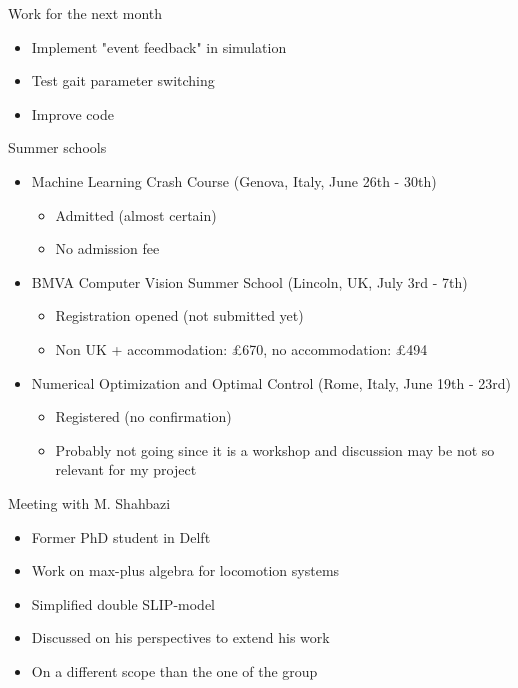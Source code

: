 \documentclass{beamer}
\begin{document}
\begin{frame}{Work for the next month}
\begin{itemize}\setlength\itemsep{3em}
\item Implement "event feedback" in simulation
\item Test gait parameter switching
\item Improve code
\end{itemize}
\end{frame}

\begin{frame}{Summer schools}
\begin{itemize}
\item Machine Learning Crash Course (Genova, Italy, June 26th - 30th)
\begin{itemize}
\item Admitted (almost certain)
\item No admission fee
\end{itemize}
\item BMVA Computer Vision Summer School (Lincoln, UK, July 3rd - 7th)
\begin{itemize}
\item Registration opened (not submitted yet)
\item Non UK + accommodation: £670, no accommodation: £494
\end{itemize}
\item Numerical Optimization and Optimal Control (Rome, Italy, June 19th - 23rd)
\begin{itemize}
\item Registered (no confirmation)
\item Probably not going since it is a workshop and discussion may be not so relevant for my project
\end{itemize}
\end{itemize}
\end{frame}

\begin{frame}{Meeting with M. Shahbazi}
\begin{itemize}\setlength\itemsep{2em}
\item Former PhD student in Delft
\item Work on max-plus algebra for locomotion systems
\item Simplified double SLIP-model
\item Discussed on his perspectives to extend his work
\item On a different scope than the one of the group
\end{itemize}
\end{frame}
\end{document}
